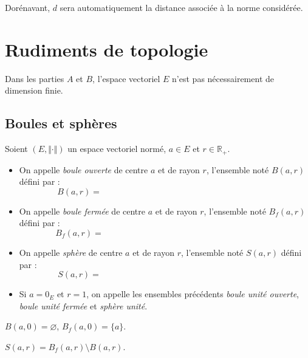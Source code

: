 \documentclass[a4paper,10pt]{report}
\begin{document}
\medskip

\noindent Dorénavant, $d$ sera automatiquement la distance associée à la norme considérée.

%


\section{Rudiments de topologie}

\noindent Dans les parties $A$ et $B$, l'espace vectoriel $E$ n'est pas nécessairement de dimension finie.
 
\subsection{Boules et sphères}
\begin{defin} Soient $(E, \Vert \cdot \Vert)$ un espace vectoriel normé, $a \in E$ et $r \in \mathbb{R}_+$.

\begin{itemize}
\item On appelle \textit{boule ouverte} de centre $a$ et de rayon $r$, l'ensemble noté $B(a,r)$ défini par :
$$ B(a,r) = \phantom{\lbrace x \in E, \, d(x,a)<r \rbrace =  \lbrace x \in E, \, \Vert x-a \Vert <r \rbrace}$$
\item On appelle \textit{boule fermée} de centre $a$ et de rayon $r$, l'ensemble noté $B_f(a,r)$ défini par :
$$ B_f(a,r) = \phantom{\lbrace x \in E, \, d(x,a) \leq r \rbrace =  \lbrace x \in E, \, \Vert x-a \Vert \leq r \rbrace}$$
\item On appelle \textit{sphère} de centre $a$ et de rayon $r$, l'ensemble noté $S(a,r)$ défini par :
$$ S(a,r) = \phantom{\lbrace x \in E, \, d(x,a) = r \rbrace =  \lbrace x \in E, \, \Vert x-a \Vert = r \rbrace}$$
\item Si $a=0_E$ et $r=1$, on appelle les ensembles précédents \textit{boule unité ouverte}, \textit{boule unité fermée} et \textit{sphère unité}. 
\end{itemize}
\end{defin}

\begin{rems}
\item $B(a,0) = \varnothing$, $B_f(a,0) = \lbrace a \rbrace$.
\item $S(a,r)= B_f(a,r) \setminus B(a,r)$.
\end{rems}
\end{document}
